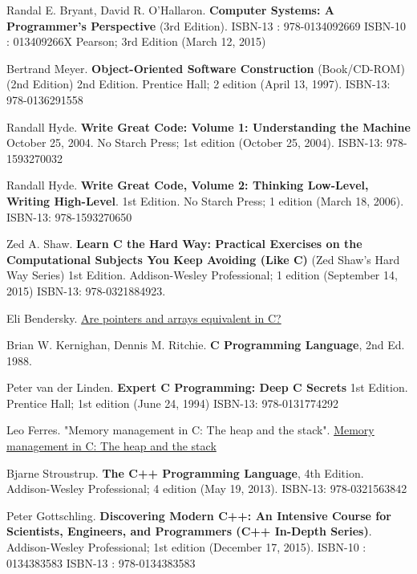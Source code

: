 \documentclass[10pt]{amsart}
\begin{document}
\begin{thebibliography}{9}

Randal E. Bryant, David R. O'Hallaron. \textbf{Computer Systems: A Programmer's Perspective} (3rd Edition). ISBN-13 : 978-0134092669
ISBN-10 : 013409266X
 Pearson; 3rd Edition (March 12, 2015) 

Bertrand Meyer. \textbf{Object-Oriented Software Construction} (Book/CD-ROM) (2nd Edition) 2nd Edition.   Prentice Hall; 2 edition (April 13, 1997).  ISBN-13: 978-0136291558

Randall Hyde.  \textbf{Write Great Code: Volume 1: Understanding the Machine} October 25, 2004.  No Starch Press; 1st edition (October 25, 2004).  ISBN-13: 978-1593270032

Randall Hyde.  \textbf{Write Great Code, Volume 2: Thinking Low-Level, Writing High-Level}.   1st Edition.  No Starch Press; 1 edition (March 18, 2006).  ISBN-13: 978-1593270650

Zed A. Shaw.  \textbf{Learn C the Hard Way: Practical Exercises on the Computational Subjects You Keep Avoiding (Like C)} (Zed Shaw's Hard Way Series) 1st Edition.  Addison-Wesley Professional; 1 edition (September 14, 2015) ISBN-13: 978-0321884923.  

Eli Bendersky.   \href{https://eli.thegreenplace.net/2009/10/21/are-pointers-and-arrays-equivalent-in-c}{Are pointers and arrays equivalent in C?}

Brian W. Kernighan, Dennis M. Ritchie.  \textbf{C Programming Language}, 2nd Ed. 1988.   

Peter van der Linden.  \textbf{Expert C Programming: Deep C Secrets} 1st Edition.  Prentice Hall; 1st edition (June 24, 1994)  ISBN-13: 978-0131774292

Leo Ferres.  "Memory management in C: The heap and the stack".  \href{http://www.inf.udec.cl/~leo/teoX.pdf}{Memory management in C: The heap and the stack}




Bjarne Stroustrup.  \textbf{The C++ Programming Language}, 4th Edition. Addison-Wesley Professional; 4 edition (May 19, 2013).  ISBN-13: 978-0321563842

Peter Gottschling. \textbf{Discovering Modern C++: An Intensive Course for Scientists, Engineers, and Programmers (C++ In-Depth Series)}. Addison-Wesley Professional; 1st edition (December 17, 2015). ISBN-10 : 0134383583
ISBN-13 : 978-0134383583 



\end{thebibliography}
\end{document}
